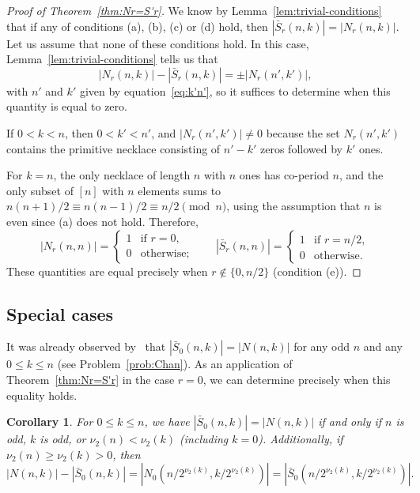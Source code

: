 \documentclass[12pt]{article}
\newcommand{\card}[1]{\left|#1\right|}
\newcommand{\bS}{\bar{S}}
\newtheorem{corollary}[theorem]{Corollary}
\theoremstyle{definition}
\begin{document}
\begin{proof}[Proof of Theorem~\ref{thm:Nr=S'r}] 
We know by Lemma~\ref{lem:trivial-conditions} that if any of conditions (a), (b), (c) or (d) hold, then $\card{\bS_r(n, k)} = \card{N_r(n, k)}$.
Let us assume that none of these conditions hold. In this case, Lemma~\ref{lem:trivial-conditions} tells us that
\begin{equation*}
    \card{N_r(n, k)} - \card{\bS_r(n, k)} =  \pm\card{N_r(n', k')},
\end{equation*}
with $n'$ and $k'$ given by equation~\eqref{eq:k'n'}, so it suffices to determine when this quantity is equal to zero.

If $0 < k < n$, then $0<k'<n'$, and
$\card{N_r(n', k')}\neq 0$ because the set $N_r(n', k')$ contains the primitive necklace consisting of $n'-k'$ zeros followed by $k'$ ones.

For $k = n$, the only necklace of length $n$ with $n$ ones has co-period $n$, and the only subset of $[n]$ with $n$ elements sums to $n(n + 1) / 2 \equiv n(n - 1) / 2 \equiv n/2 \pmod{n}$, using the assumption that $n$ is even since (a) does not hold. 
Therefore,
\begin{equation*}\label{eq:k=n}
    \card{N_r(n, n)} =
    \begin{cases}
        1 & \text{if } r = 0, \\
        0 & \text{otherwise};
    \end{cases} \qquad
    \card{\bS_r(n, n)} =
    \begin{cases}
        1 & \text{if } r = n/2, \\
        0 & \text{otherwise}.
    \end{cases}
\end{equation*}
These quantities are equal precisely when $r\notin\{0,n/2\}$ (condition (e)).
\end{proof}

\subsection{Special cases}
It was already observed by~\cite{Chan} that $\card{\bS_0(n, k)}=\card{N(n, k)}$ for any odd $n$ and any $0 \leq k \leq n$ (see Problem~\ref{prob:Chan}). As an
application of Theorem~\ref{thm:Nr=S'r} in the case $r=0$, we can determine precisely when this equality holds. 

\begin{corollary}
    \label{cor:r=0-gen}
    For $0\le k\le n$, we have $\card{\bS_0(n, k)} = \card{N(n, k)}$ if and only if $n$ is odd, $k$ is odd, or $\nu_2(n) < \nu_2(k)$ (including $k = 0$).
    Additionally, if $\nu_2(n) \geq \nu_2(k) > 0$, then
    \begin{equation*}
        \card{N(n, k)} - \card{\bS_0(n, k)} = \card{N_0(n / 2^{\nu_2(k)}, k / 2^{\nu_2(k)})} = \card{\bS_0(n / 2^{\nu_2(k)}, k / 2^{\nu_2(k)})}.
    \end{equation*}
\end{corollary}
\end{document}
